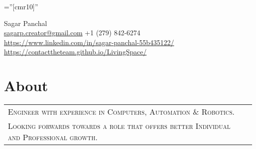 \documentclass[a4paper,10pt]{article}
\begin{document}

\pagestyle{empty} %

\font\fb=''[cmr10]'' %

\par{\centering

		 \href{https://contacttheteam.github.io/LivingSpace/}{ \Uparrow }  {\Large Sagar Panchal\textsc{}}\\
		{\small \href{mailto:sagarp.creator@gmail.com}{sagarp.creator@gmail.com} 
		\textbullet \textsc{ +1 (279) 842-6274}
		}\\
		\small \href{https://www.linkedin.com/in/sagar-panchal-55b435122/}{https://www.linkedin.com/in/sagar-panchal-55b435122/}
		\textbullet \small \href{https://contacttheteam.github.io/LivingSpace/}{https://contacttheteam.github.io/LivingSpace/}
\par}


\section{About}
\begin{tabular}{ll}
\textsc{Engineer with experience in Computers,  Automation \& Robotics.}\\
\textsc{Looking forwards towards a role that offers better Individual and Professional growth.}\\
\end{tabular}
\end{document}
